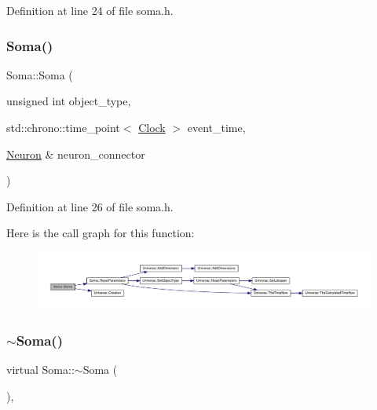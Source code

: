 Definition at line 24 of file soma.\+h.

\mbox{\label{class_soma_a451e3918aa5f3ec5670fa08d4d710dd6}} 
\subsubsection{\texorpdfstring{Soma()}{Soma()}\hspace{0.1cm}{\footnotesize\ttfamily [4/4]}}
{\footnotesize\ttfamily Soma\+::\+Soma (\begin{DoxyParamCaption}\item[{unsigned int}]{object\+\_\+type,  }\item[{std\+::chrono\+::time\+\_\+point$<$ \hyperlink{universe_8h_a0ef8d951d1ca5ab3cfaf7ab4c7a6fd80}{Clock} $>$}]{event\+\_\+time,  }\item[{\hyperlink{class_neuron}{Neuron} \&}]{neuron\+\_\+connector }\end{DoxyParamCaption})\hspace{0.3cm}{\ttfamily [inline]}}



Definition at line 26 of file soma.\+h.

Here is the call graph for this function\+:
\nopagebreak
\begin{figure}[H]
\begin{center}
\leavevmode
\includegraphics[width=350pt]{class_soma_a451e3918aa5f3ec5670fa08d4d710dd6_cgraph}
\end{center}
\end{figure}
\mbox{\label{class_soma_a482570e6b3e366db93396add6ba1922d}} 
\subsubsection{\texorpdfstring{$\sim$\+Soma()}{~Soma()}}
{\footnotesize\ttfamily virtual Soma\+::$\sim$\+Soma (\begin{DoxyParamCaption}{ }\end{DoxyParamCaption})\hspace{0.3cm}{\ttfamily [inline]}, {\ttfamily [virtual]}}

